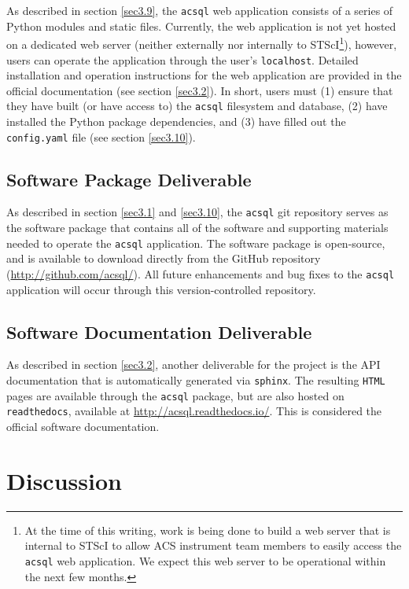 \documentclass[10pt,journal,compsoc]{IEEEtran}
\begin{document}
As described in section \ref{sec3.9}, the \texttt{acsql} web application consists of a series of Python modules and static files.  Currently, the web application is not yet hosted on a
dedicated web server (neither externally nor internally to STScI\footnote{At the time of this writing, work is being done to build a web server that is internal to STScI to allow ACS instrument
team members to easily access the \texttt{acsql} web application.  We expect this web server to be operational within the next few months.}), however, users can operate the application through
the user's \texttt{localhost}.  Detailed installation and operation instructions for the web application are provided in the official documentation (see section \ref{sec3.2}).  In short,
users must (1) ensure that they have built (or have access to) the \texttt{acsql} filesystem and database, (2) have installed the Python package dependencies, and (3) have filled out the
\texttt{config.yaml} file (see section \ref{sec3.10}).


\subsection{Software Package Deliverable} \label{sec4.4}

As described in section \ref{sec3.1} and \ref{sec3.10}, the \texttt{acsql} git repository serves as the software package that contains all of the software and supporting materials needed to
operate the \texttt{acsql} application.  The software package is open-source, and is available to download directly from the GitHub repository (\textcolor{blue}{\url{http://github.com/acsql/}}).
All future enhancements and bug fixes to the \texttt{acsql} application will occur through this version-controlled repository.


\subsection{Software Documentation Deliverable} \label{sec4.5}

As described in section \ref{sec3.2}, another deliverable for the project is the API documentation that is automatically generated via \texttt{sphinx}.  The resulting \texttt{HTML} pages are
available through the \texttt{acsql} package, but are also hosted on \texttt{readthedocs}, available at \textcolor{blue}{\url{http://acsql.readthedocs.io/}}.  This is considered the official software
documentation.


\section{Discussion} \label{chap5}
\end{document}
